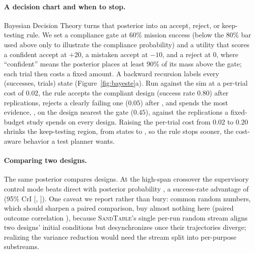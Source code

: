 \documentclass[11pt]{article}
\newcommand{\sandtable}{\textsc{SandTable}}
\begin{document}
\paragraph{A decision chart and when to stop.} Bayesian Decision Theory turns that posterior into an
accept, reject, or keep-testing rule. We set a compliance gate at 60\% mission success (below the 80\% bar used above only to illustrate the compliance probability) and a utility that scores a confident accept at $+20$, a mistaken accept at $-10$, and a reject at $0$, where ``confident'' means the posterior places at least 90\% of its mass above the gate; each trial then costs a fixed amount. A backward recursion labels every (successes, trials) state (Figure~\ref{fig:bayeste}a). Run against the sim at a per-trial cost of $0.02$, the rule accepts the compliant design (success rate $0.80$) after \bteStopAccept{} replications, rejects a clearly failing one ($0.05$) after \bteStopReject{}, and spends the most evidence, \bteStopBorder{}, on the design nearest the gate ($0.45$), against the \bteN{} replications a fixed-budget study spends on every design. Raising the per-trial cost from $0.02$ to $0.20$ shrinks the keep-testing region, from \bteContinueCheap{} states to \bteContinueDear{}, so the rule stops sooner, the cost-aware behavior a test planner wants.

\paragraph{Comparing two designs.} The same posterior compares designs. At the high-span crossover
the supervisory control mode beats direct with posterior probability \bteProbSupBetter{}, a success-rate advantage of \bteContrastMean{} (95\% CrI [\bteContrastLo{}, \bteContrastHi{}]). One caveat we report rather than bury: common random numbers, which should sharpen a paired comparison, buy almost nothing here (paired outcome correlation \bteCrnCorr{}), because \sandtable{}'s single per-run random stream aligns two designs' initial conditions but desynchronizes once their trajectories diverge; realizing the variance reduction would need the stream split into per-purpose substreams.
\end{document}
